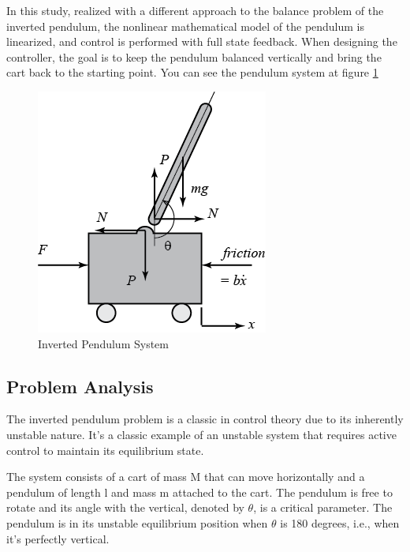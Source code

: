 \documentclass[11pt,twocolumn,twoside,lineno]{pnas-new}
\begin{document}
In this study, realized with a different approach to the balance problem of the inverted pendulum, the nonlinear mathematical model of the pendulum is linearized, and control is performed with full state feedback. When designing the controller, the goal is to keep the pendulum balanced vertically and bring the cart back to the starting point. You can see the pendulum system at figure \ref{pendulum}
\begin{figure}[h]
       \centering
       \includegraphics[width=0.9\linewidth]{problem/pendulum.png}
       \caption{Inverted Pendulum System}
       \label{pendulum}
\end{figure}

\subsection{Problem Analysis}
The inverted pendulum problem is a classic in control theory due to its inherently unstable nature. It's a classic example of an unstable system that requires active control to maintain its equilibrium state. 

The system consists of a cart of mass M that can move horizontally and a pendulum of length l and mass m attached to the cart. The pendulum is free to rotate and its angle with the vertical, denoted by $\theta$, is a critical parameter. The pendulum is in its unstable equilibrium position when $\theta$ is 180 degrees, i.e., when it's perfectly vertical. 
\end{document}
